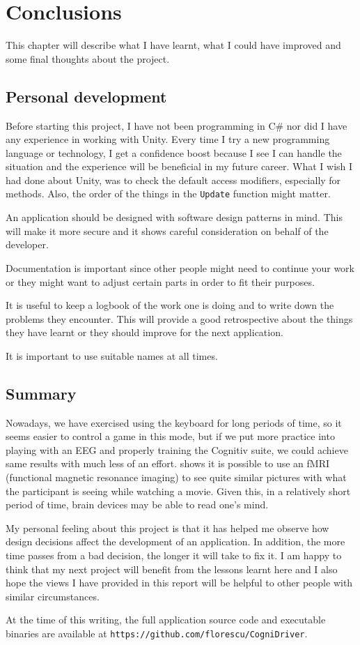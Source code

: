 \chapter{Conclusions}
\label{cha:conclusions}
This chapter will describe what I have learnt, what I could have improved and some final thoughts about the project.

\section{Personal development}
Before starting this project, I have not been programming in C\# nor did I have any experience in working with Unity. Every time I try a new programming language or technology, I get a confidence boost because I see I can handle the situation and the experience will be beneficial in my future career. What I wish I had done about Unity, was to check the default access modifiers, especially for methods. Also, the order of the things in the \texttt{Update} function might matter. 

An application should be designed with software design patterns in mind. This will make it more secure and it shows careful consideration on behalf of the developer. 

Documentation is important since other people might need to continue your work or they might want to adjust certain parts in order to fit their purposes.

It is useful to keep a logbook of the work one is doing and to write down the problems they encounter. This will provide a good retrospective about the things they have learnt or they should improve for the next application.

It is important to use suitable names at all times.

\section{Summary}

Nowadays, we have exercised using the keyboard for long periods of time, so it seems easier to control a game in this mode, but if we put more practice into playing with an EEG and properly training the Cognitiv suite, we could achieve same results with much less of an effort. \cite{moviebrain} shows it is possible to use an fMRI (functional magnetic resonance imaging) to see quite similar pictures with what the participant is seeing while watching a movie. Given this, in a relatively short period of time, brain devices may be able to read one's mind.

My personal feeling about this project is that it has helped me observe how design decisions affect the development of an application. In addition, the more time passes from a bad decision, the longer it will take to fix it. I am happy to think that my next project will benefit from the lessons learnt here and I also hope the views I have provided in this report will be helpful to other people with similar circumstances.

At the time of this writing, the full application source code and executable binaries are available at \texttt{https://github.com/florescu/CogniDriver}.

\nocite{jmurray}